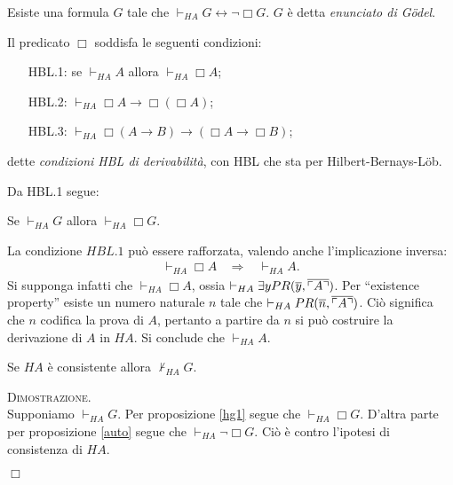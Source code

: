 	\begin{prop}
	\label{auto}
	Esiste una formula $G$ tale che $\vdash_{HA} G \leftrightarrow\neg\Box G$.
	$G$ \`e detta \textit{enunciato di G\"odel}.
	\end{prop}
	
	\begin{thm} Il predicato $\Box$ soddisfa le seguenti condizioni:
	
	\begin{itemize}
 	\item[\small{HBL.1}:] se $\vdash_{HA}A$ allora $\vdash_{HA}\Box A$;
 	\item[\small{HBL.2}:] $\vdash_{HA} \Box A\rightarrow \Box(\Box A)$;
 	\item[\small{HBL.3}:] $\vdash_{HA} \Box(A\rightarrow B)
 	\rightarrow (\Box A\rightarrow \Box B)$;
	\end{itemize}
	dette \textit{condizioni HBL di derivabilit\`a}, con HBL che
	sta per Hilbert-Bernays-L\"ob.
	\end{thm}

	Da HBL.1 segue:
	
	\begin{prop}
	\label{hg1}Se $\vdash_{HA} G$ allora $\vdash_{HA}\Box G$.
	\end{prop}

	\begin{oss}
	\label{oss:HBL}
	La condizione $HBL.1$ pu\`o essere rafforzata, valendo anche l'implicazione inversa:
	\begin{eqnarray}
	\vdash_{HA}\Box A\:\:\:\:\Rightarrow\:\:\:\:\vdash_{HA} A.\nonumber
	\end{eqnarray}
	Si supponga infatti che $\vdash_{HA}\Box A$, ossia $\vdash_{HA}\exists
	yPR(\overline{y},\overline{\ulcorner A \urcorner})$.
	Per ``existence property''  esiste un numero naturale $n$ tale
	che $\vdash_{HA} PR(\overline{n},\overline{\ulcorner A \urcorner})$.
	Ci\`o significa che $n$ codifica la prova di $A$, pertanto a
	partire da $n$ si pu\`o costruire la derivazione di $A$ in $HA$.
	Si conclude che $\vdash_{HA} A$.
	\end{oss}

	\begin{thm}
	\label{teo:nonG}
	Se $HA$ \`e consistente allora $\not\vdash_{HA} G$.
	\end{thm}

	\textsc{Dimostrazione.}\\
	Supponiamo $\vdash_{HA} G$. Per proposizione \ref{hg1}
	segue che $\vdash_{HA}\Box G$.
	D'altra parte per proposizione \ref{auto} segue che
	$\vdash_{HA}\neg\Box G$. Ci\`o \`e 
	contro l'ipotesi di consistenza di $HA$.
	\begin{flushright}$\Box$\end{flushright}

